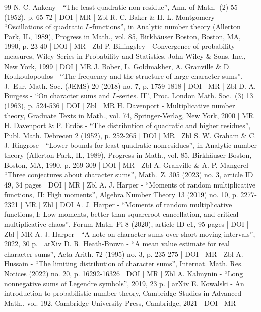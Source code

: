 \begin{thebibliography}{99}
N. C. Ankeny - “The least quadratic non residue”, Ann. of Math. (2) 55 (1952), p. 65-72 | DOI | MR | Zbl
R. C. Baker \& H. L. Montgomery - “Oscillations of quadratic $L$-functions”, in Analytic number theory (Allerton Park, IL, 1989), Progress in Math., vol. 85, Birkhäuser Boston, Boston, MA, 1990, p. 23-40 | DOI | MR | Zbl
P. Billingsley - Convergence of probability measures, Wiley Series in Probability and Statistics, John Wiley \& Sons, Inc., New York, 1999 | DOI | MR
J. Bober, L. Goldmakher, A. Granville \& D. Koukoulopoulos - “The frequency and the structure of large character sums”, J. Eur. Math. Soc. (JEMS) 20 (2018) no. 7, p. 1759-1818 | DOI | MR | Zbl
D. A. Burgess - “On character sums and $L$-series. II”, Proc. London Math. Soc. (3) 13 (1963), p. 524-536 | DOI | Zbl | MR
H. Davenport - Multiplicative number theory, Graduate Texts in Math., vol. 74, Springer-Verlag, New York, 2000 | MR
H. Davenport \& P. Erdős - “The distribution of quadratic and higher residues”, Publ. Math. Debrecen 2 (1952), p. 252-265 | DOI | MR | Zbl
S. W. Graham \& C. J. Ringrose - “Lower bounds for least quadratic nonresidues”, in Analytic number theory (Allerton Park, IL, 1989), Progress in Math., vol. 85, Birkhäuser Boston, Boston, MA, 1990, p. 269-309 | DOI | MR | Zbl
A. Granville \& A. P. Mangerel - “Three conjectures about character sums”, Math. Z. 305 (2023) no. 3, article ID 49, 34 pages | DOI | MR | Zbl
A. J. Harper - “Moments of random multiplicative functions, II: High moments”, Algebra Number Theory 13 (2019) no. 10, p. 2277-2321 | MR | Zbl | DOI
A. J. Harper - “Moments of random multiplicative functions, I: Low moments, better than squareroot cancellation, and critical multiplicative chaos”, Forum Math. Pi 8 (2020), article ID e1, 95 pages | DOI | Zbl | MR
A. J. Harper - “A note on character sums over short moving intervals”, 2022, 30 p. | arXiv
D. R. Heath-Brown - “A mean value estimate for real character sums”, Acta Arith. 72 (1995) no. 3, p. 235-275 | DOI | MR | Zbl
A. Hussain - “The limiting distribution of character sums”, Internat. Math. Res. Notices (2022) no. 20, p. 16292-16326 | DOI | MR | Zbl
A. Kalmynin - “Long nonnegative sums of Legendre symbols”, 2019, 23 p. | arXiv
E. Kowalski - An introduction to probabilistic number theory, Cambridge Studies in Advanced Math., vol. 192, Cambridge University Press, Cambridge, 2021 | DOI | MR

\end{thebibliography}
